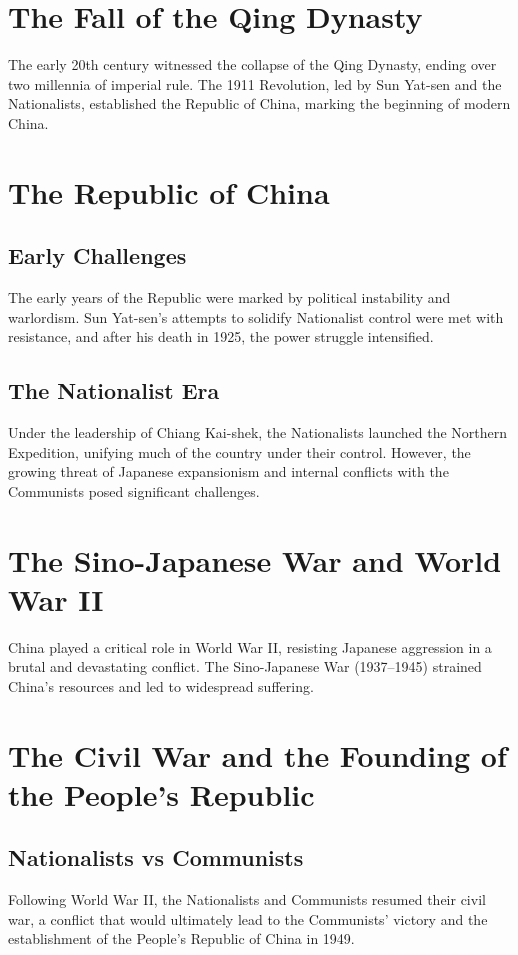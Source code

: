 \documentclass[a4paper,12pt]{book}
\begin{document}
\section{The Fall of the Qing Dynasty}
\label{sec:fall-qing-dynasty}
The early 20th century witnessed the collapse of the Qing Dynasty, ending over two millennia of imperial rule. The 1911 Revolution, led by Sun Yat-sen and the Nationalists, established the Republic of China, marking the beginning of modern China.

\section{The Republic of China}
\label{sec:republic-china}
\subsection{Early Challenges}
The early years of the Republic were marked by political instability and warlordism. Sun Yat-sen's attempts to solidify Nationalist control were met with resistance, and after his death in 1925, the power struggle intensified.

\subsection{The Nationalist Era}
Under the leadership of Chiang Kai-shek, the Nationalists launched the Northern Expedition, unifying much of the country under their control. However, the growing threat of Japanese expansionism and internal conflicts with the Communists posed significant challenges.

\section{The Sino-Japanese War and World War II}
\label{sec:sino-japanese-war}
China played a critical role in World War II, resisting Japanese aggression in a brutal and devastating conflict. The Sino-Japanese War (1937–1945) strained China's resources and led to widespread suffering.

\section{The Civil War and the Founding of the People's Republic}
\label{sec:civil-war-prc}
\subsection{Nationalists vs Communists}
Following World War II, the Nationalists and Communists resumed their civil war, a conflict that would ultimately lead to the Communists' victory and the establishment of the People's Republic of China in 1949.
\end{document}

